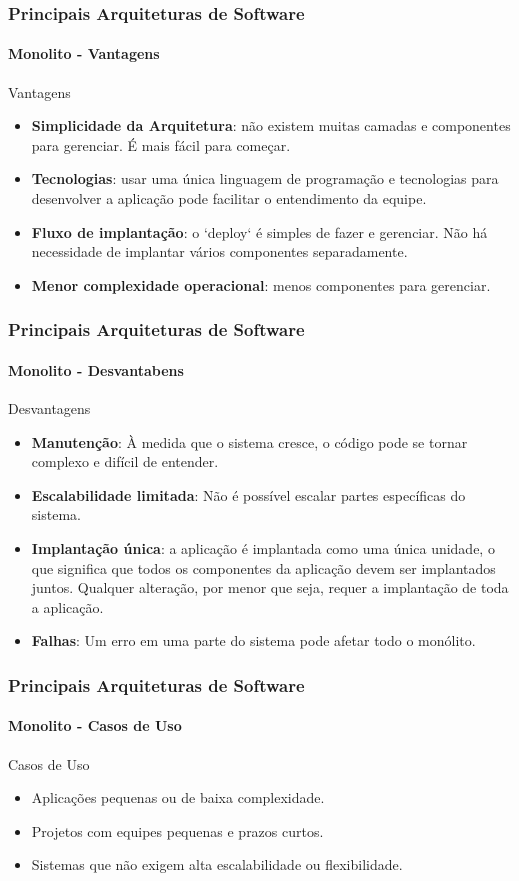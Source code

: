 \documentclass[
	10pt, %
	t, %
]{beamer}
\begin{document}
\begin{frame}
	\frametitle{Principais Arquiteturas de Software}
	\framesubtitle{Monolito - Vantagens}

	\begin{exampleblock}{Vantagens}
		\begin{itemize}
			\item \textbf{Simplicidade da Arquitetura}: não existem muitas camadas e componentes para gerenciar. É mais fácil para começar.
			\item \textbf{Tecnologias}: usar uma única linguagem de programação e tecnologias para desenvolver a aplicação pode facilitar o entendimento da equipe.
			\item \textbf{Fluxo de implantação}: o `deploy` é simples de fazer e gerenciar. Não há necessidade de implantar vários componentes separadamente.
			\item \textbf{Menor complexidade operacional}: menos componentes para gerenciar.
		\end{itemize}
	\end{exampleblock}

\end{frame}

\begin{frame}
	\frametitle{Principais Arquiteturas de Software}
	\framesubtitle{Monolito - Desvantabens}

	\begin{alertblock}{Desvantagens}
		\begin{itemize}
			\item \textbf{Manutenção}: À medida que o sistema cresce, o código pode se tornar complexo e difícil de entender.
			\item \textbf{Escalabilidade limitada}: Não é possível escalar partes específicas do sistema.
			\item \textbf{Implantação única}: a aplicação é implantada como uma única unidade, o que significa que todos os componentes da aplicação devem ser implantados juntos. Qualquer alteração, por menor que seja, requer a implantação de toda a aplicação.
			\item \textbf{Falhas}: Um erro em uma parte do sistema pode afetar todo o monólito.
		\end{itemize}
	\end{alertblock}

\end{frame}

\begin{frame}
	\frametitle{Principais Arquiteturas de Software}
	\framesubtitle{Monolito - Casos de Uso}

	\begin{exampleblock}{Casos de Uso}
		\begin{itemize}
			\item Aplicações pequenas ou de baixa complexidade.
			\item Projetos com equipes pequenas e prazos curtos.
			\item Sistemas que não exigem alta escalabilidade ou flexibilidade.
		\end{itemize}
	\end{exampleblock}

\end{frame}
\end{document}
